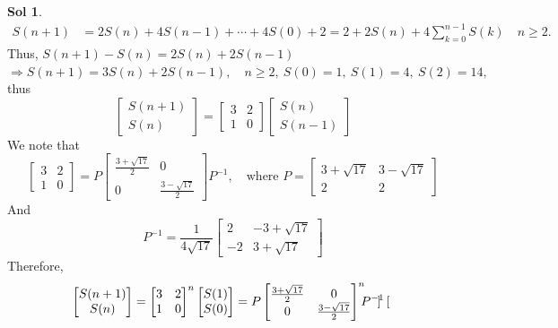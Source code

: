 \documentclass[12pt,a4paper]{report}
\theoremstyle{definition}
\newtheorem*{sol}{Sol}
\begin{document}
\begin{sol}
\begin{align*}
		S(n+1)&=2S(n)+4S(n-1)+\cdots +4S(0)+2=2+2S(n)+4\sum_{k=0}^{n-1}S(k)\quad n\geq 2.
		\end{align*}
		Thus, $S(n+1)-S(n)=2S(n)+2S(n-1)$\\$\Rightarrow S(n+1)=3S(n)+2S(n-1),\quad n\geq 2,\ S(0)=1,\ S(1)=4,\ S(2)=14,$ thus
		\[
		\begin{bmatrix}
		S(n+1)\\
		S(n)
		\end{bmatrix}=\begin{bmatrix}
		3 & 2\\
		1 & 0
		\end{bmatrix}\begin{bmatrix}
		S(n)\\
		S(n-1)
		\end{bmatrix}
		\]
		We note that 
		\[
		\begin{bmatrix}
		3 & 2\\
		1 & 0
		\end{bmatrix}=P\begin{bmatrix}
		\frac{3+\sqrt{17}}{2} & 0\\
		0 & \frac{3-\sqrt{17}}{2}
		\end{bmatrix}P^{-1},\quad\mbox{where }P=\begin{bmatrix}
		3+\sqrt{17} & 3-\sqrt{17}\\
		2 & 2
		\end{bmatrix}
		\]
		And
		\[
		P^{-1}=\frac{1}{4\sqrt{17}}\begin{bmatrix}
		2 & -3+\sqrt{17}\\
		-2 & 3+\sqrt{17}
		\end{bmatrix}
		\]
		Therefore,
		\begin{align*}
		    \begin{bmatrix}
		    S(n+1)\\
		    S(n)
		    \end{bmatrix}&=\begin{bmatrix}
		    3 & 2\\
		    1 & 0
		    \end{bmatrix}^n\begin{bmatrix}
		    S(1)\\
		    S(0)
		    \end{bmatrix}=P\begin{bmatrix}
    		\frac{3+\sqrt{17}}{2} & 0\\
    		0 & \frac{3-\sqrt{17}}{2}
    		\end{bmatrix}^n\hspace{-5pt} P^{-1}\begin{bmatrix}

\end{bmatrix}
\end{align*}
\end{sol}
\end{document}
